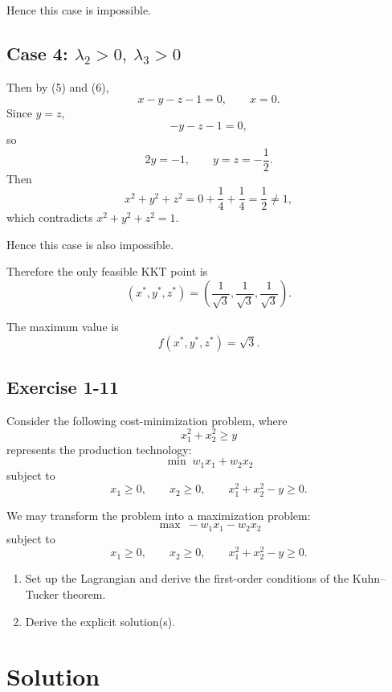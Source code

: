 Hence this case is impossible.

\subsection*{Case 4: \(\lambda_2>0,\ \lambda_3>0\)}

Then by (5) and (6),
\[
x-y-z-1=0,
\qquad
x=0.
\]
Since \(y=z\),
\[
-y-z-1=0,
\]
so
\[
2y=-1,
\qquad
y=z=-\frac12.
\]
Then
\[
x^2+y^2+z^2
=
0+\frac14+\frac14
=
\frac12 \neq 1,
\]
which contradicts \(x^2+y^2+z^2=1\).

Hence this case is also impossible.

Therefore the only feasible KKT point is
\[
\boxed{
\left(x^*,y^*,z^*\right)
=
\left(\frac1{\sqrt3},\frac1{\sqrt3},\frac1{\sqrt3}\right).
}
\]

The maximum value is
\[
\boxed{
f(x^*,y^*,z^*)=\sqrt3.
}
\]



\vspace{30pt}
\begin{tcolorbox}[breakable]

\subsection*{Exercise 1-11}

Consider the following cost-minimization problem, where
\[
x_1^2 + x_2^2 \ge y
\]
represents the production technology:
\[
\min \; w_1 x_1 + w_2 x_2
\]
subject to
\[
x_1 \ge 0,\qquad x_2 \ge 0,\qquad x_1^2 + x_2^2 - y \ge 0.
\]

We may transform the problem into a maximization problem:
\[
\max \; -w_1 x_1 - w_2 x_2
\]
subject to
\[
x_1 \ge 0,\qquad x_2 \ge 0,\qquad x_1^2 + x_2^2 - y \ge 0.
\]

\begin{enumerate}
    \item[(i)] Set up the Lagrangian and derive the first-order conditions
    of the Kuhn--Tucker theorem.
    \item[(ii)] Derive the explicit solution(s).
\end{enumerate}

\end{tcolorbox}



\section*{Solution}

